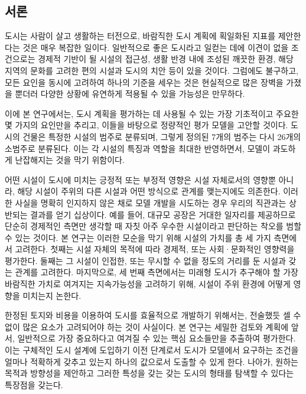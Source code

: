 \documentclass[10pt]{article}
\begin{document}
 \begin{multicols}{2}
 
 
\section{서론}
도시는 사람이 살고 생활하는 터전으로, 바람직한 도시 계획에 획일화된 지표를 제안한다는 것은 매우 복잡한 일이다. 일반적으로 좋은 도시라고 일컫는 데에 이견이 없을 조건으로는 경제적 기반이 될 시설의 접근성, 생활 반경 내에 조성된 깨끗한 환경, 해당 지역의 문화를 고려한 편의 시설과 도시의 치안 등이 있을 것이다. 그럼에도 불구하고, 모든 요인을 동시에 고려하여 하나의 기준을 세우는 것은 현실적으로 많은 장벽을 가졌을 뿐더러 다양한 상황에 유연하게 적용될 수 있을 가능성은 만무하다.

이에 본 연구에서는, 도시 계획을 평가하는 데 사용될 수 있는 가장 기초적이고 주요한 몇 가지의 요인만을 추리고, 이들을 바탕으로 정량적인 평가 모델을 고안할 것이다. 도시의 건물은 특정한 시설의 범주로 분류되며, 그렇게 정의된 7개의 범주는 다시 26개의 소범주로 분류된다. 이는 각 시설의 특징과 역할을 최대한 반영하면서, 모델이 과도하게 난잡해지는 것을 막기 위함이다.

어떤 시설이 도시에 미치는 긍정적 또는 부정적 영향은 시설 자체로서의 영향뿐 아니라, 해당 시설이 주위의 다른 시설과 어떤 방식으로 관계를 맺는지에도 의존한다. 이러한 사실을 명확히 인지하지 않은 채로 모델 개발을 시도하는 경우 우리의 직관과는 상반되는 결과를 얻기 십상이다. 예를 들어, 대규모 공장은 거대한 일자리를 제공하므로 단순히 경제적인 측면만 생각할 때 자칫 아주 우수한 시설이라고 판단하는 착오를 범할 수 있는 것이다. 본 연구는 이러한 모순을 막기 위해 시설의 가치를 총 세 가지 측면에서 고려한다. 첫째는 시설 자체의 목적에 따라 경제적, 또는 사회·문화적인 영향력을 평가한다. 둘째는 그 시설이 인접한, 또는 무시할 수 없을 정도의 거리를 둔 시설과 갖는 관계를 고려한다. 마지막으로, 세 번째 측면에서는 미래형 도시가 추구해야 할 가장 바람직한 가치로 여겨지는 지속가능성을 고려하기 위해, 시설이 주위 환경에 어떻게 영향을 미치는지 논한다.

한정된 토지와 비용을 이용하여 도시를 효율적으로 개발하기 위해서는, 전술했듯 셀 수 없이 많은 요소가 고려되어야 하는 것이 사실이다. 본 연구는 세밀한 검토와 계획에 앞서, 일반적으로 가장 중요하다고 여겨질 수 있는 핵심 요소들만을 추출하여 평가한다. 이는 구체적인 도시 설계에 도입하기 이전 단계로서 도시가 모델에서 요구하는 조건을 얼마나 적확하게 갖추고 있는지 하나의 값으로서 도출할 수 있게 한다. 나아가, 원하는 목적과 방향성을 제안하고 그러한 특성을 갖는 갖는 도시의 형태를 탐색할 수 있다는 특장점을 갖는다.


\end{multicols}
\end{document}
